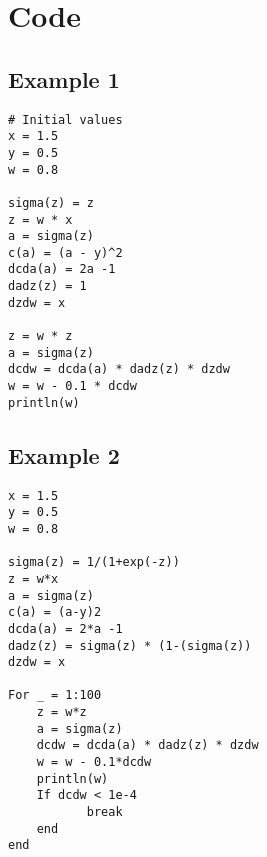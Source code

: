 \section{Code}
\subsection{Example 1}
\begin{verbatim}
# Initial values
x = 1.5
y = 0.5
w = 0.8

sigma(z) = z
z = w * x
a = sigma(z)
c(a) = (a - y)^2
dcda(a) = 2a -1
dadz(z) = 1
dzdw = x

z = w * z
a = sigma(z)
dcdw = dcda(a) * dadz(z) * dzdw
w = w - 0.1 * dcdw
println(w)
\end{verbatim}
\subsection{Example 2}
\begin{verbatim}
x = 1.5
y = 0.5
w = 0.8

sigma(z) = 1/(1+exp(-z))
z = w*x
a = sigma(z)
c(a) = (a-y)2
dcda(a) = 2*a -1
dadz(z) = sigma(z) * (1-(sigma(z))
dzdw = x

For _ = 1:100
    z = w*z
    a = sigma(z)
    dcdw = dcda(a) * dadz(z) * dzdw 
    w = w - 0.1*dcdw
    println(w)
    If dcdw < 1e-4
	       break
    end
end
\end{verbatim}
